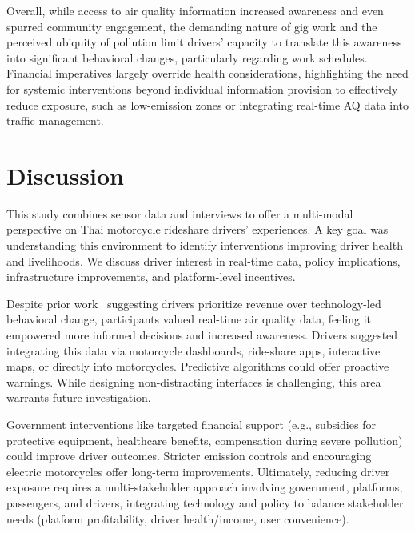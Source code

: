 \documentclass[sigconf,screen,natbib=true]{acmart}
\begin{document}
Overall, while access to air quality information increased awareness and even spurred community engagement, the demanding nature of gig work and the perceived ubiquity of pollution limit drivers' capacity to translate this awareness into significant behavioral changes, particularly regarding work schedules.
Financial imperatives largely override health considerations, highlighting the need for systemic interventions beyond individual information provision to effectively reduce exposure, such as low-emission zones or integrating real-time AQ data into traffic management. %
 \section{Discussion}

This study combines sensor data and interviews to offer a multi-modal perspective on Thai motorcycle rideshare drivers' experiences.
A key goal was understanding this environment to identify interventions improving driver health and livelihoods.
We discuss driver interest in real-time data, policy implications, infrastructure improvements, and platform-level incentives.

Despite prior work~\cite{tieanklin2024rideshare} suggesting drivers prioritize revenue over technology-led behavioral change, participants valued real-time air quality data, feeling it empowered more informed decisions and increased awareness.
Drivers suggested integrating this data via motorcycle dashboards, ride-share apps, interactive maps, or directly into motorcycles.
Predictive algorithms could offer proactive warnings.
While designing non-distracting interfaces is challenging, this area warrants future investigation.



Government interventions like targeted financial support (e.g., subsidies for protective equipment, healthcare benefits, compensation during severe pollution) could improve driver outcomes.
Stricter emission controls and encouraging electric motorcycles offer long-term improvements.
Ultimately, reducing driver exposure requires a multi-stakeholder approach involving government, platforms, passengers, and drivers, integrating technology and policy to balance stakeholder needs (platform profitability, driver health/income, user convenience).
\end{document}
